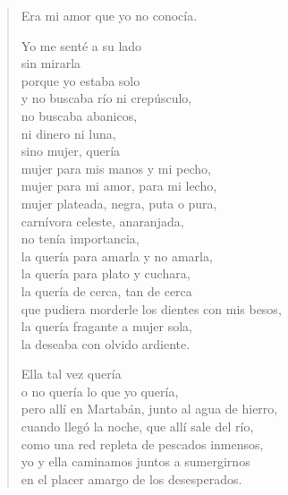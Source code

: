 \documentclass[12pt]{article}
\begin{document}
\begin{verse}
Era mi amor que yo no conocía.  

Yo me senté a su lado\\
sin mirarla\\
porque yo estaba solo\\
y no buscaba río ni crepúsculo,\\
no buscaba abanicos,\\
ni dinero ni luna,\\
sino mujer, quería\\
mujer para mis manos y mi pecho,\\
mujer para mi amor, para mi lecho,\\
mujer plateada, negra, puta o pura,\\
carnívora celeste, anaranjada,\\
no tenía importancia,\\
la quería para amarla y no amarla,\\
la quería para plato y cuchara,\\
la quería de cerca, tan de cerca\\
que pudiera morderle los dientes con mis besos,\\
la quería fragante a mujer sola,\\
la deseaba con olvido ardiente.  

Ella tal vez quería\\
o no quería lo que yo quería,\\
pero allí en Martabán, junto al agua de hierro,\\
cuando llegó la noche, que allí sale del río,\\
como una red repleta de pescados inmensos,\\
yo y ella caminamos juntos a sumergirnos\\
en el placer amargo de los desesperados.  

\end{verse}
\end{document}
